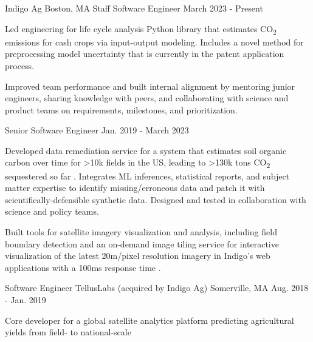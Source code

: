 \documentclass[11pt, a4paper]{awesome-cv}
\begin{document}
\begin{cventries}

  \cventrydouble
    {Indigo Ag}
    {Boston, MA}
    {Staff Software Engineer}
    {March 2023 - Present}
    {
    \begin{cvitems}
      \item Led engineering for life cycle analysis Python library that estimates CO\textsubscript{2} emissions for cash crops via input-output modeling. Includes a novel method for preprocessing model uncertainty that is currently in the patent application process.
      \item Improved team performance and built internal alignment by mentoring junior engineers, sharing knowledge with peers, and collaborating with science and product teams on requirements, milestones, and prioritization.
    \end{cvitems}
    }
    {Senior Software Engineer}
    {Jan. 2019 - March 2023}
    {
    \begin{cvitems}
      \item Developed data remediation service for a system that estimates soil organic carbon over time for >10k fields in the US, leading to >130k tons CO\textsubscript{2} sequestered so far . Integrates ML inferences, statistical reports, and subject matter expertise to identify missing/erroneous data and patch it with scientifically-defensible synthetic data. Designed and tested in collaboration with science and policy teams.
      \item Built tools for satellite imagery visualization and analysis, including field boundary detection  and an on-demand image tiling service for interactive visualization of the latest 20m/pixel resolution imagery in Indigo’s web applications with a 100ms response time .
    \end{cvitems}
    }

  \cventrytight
    {Software Engineer}
    {TellusLabs (acquired by Indigo Ag)}
    {Somerville, MA}
    {Aug. 2018 - Jan. 2019}
    {
    \begin{cvitems}
      \item Core developer for a global satellite analytics platform predicting agricultural yields from field- to national-scale
    \end{cvitems}
    }


\end{cventries}
\end{document}
